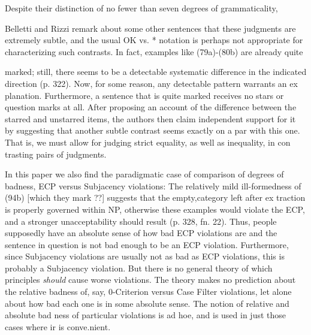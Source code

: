 \begin{styleTextbody}
Despite their distinction of no fewer than seven degrees of grammaticality,
\end{styleTextbody}


\begin{styleTextbody}
Belletti and Rizzi remark about some other sentences that {\textquotedbl}these judgments are extremely subtle, and the usual OK vs. * notation is perhaps not appropriate for characterizing such contrasts. In fact, examples like (79a)-(80b) are already quite
\end{styleTextbody}


\begin{styleTextbody}
marked; still, there seems to be a detectable systematic difference in the indicated direction{\textquotedbl} (p. 322). Now, for some reason, any detectable pattern warrants an ex\- planation. Furthermore, a sentence that is {\textquotedbl}quite marked{\textquotedbl} receives no stars or question marks at all. After proposing an account of the difference between the starred and unstarred items, the authors then claim independent support for it by suggesting that another subtle contrast seems {\textquotedbl}exactly on a par with{\textquotedbl} this one. That is, we must allow for judging strict equality, as well as inequality, in con\- trasting pairs of judgments.
\end{styleTextbody}


\begin{styleTextbody}
In this paper we also find the paradigmatic case of comparison of degrees of badness, ECP versus Subjacency violations: {\textquotedbl}The relatively mild ill-formedness of (94b) [which they mark {\textquotedbl}??{\textquotedbl}] suggests that the empty,category left after ex\- traction is properly governed within NP, otherwise these examples would violate the ECP, and a stronger unacceptability should result{\textquotedbl} (p. 328, fn. 22). Thus, people supposedly have an absolute sense of how bad ECP violations are and the sentence in question is not bad enough to be an ECP violation. Furthermore, since Subjacency violations are usually not as bad as ECP violations, this is probably a Subjacency violation. But there is no general theory of which principles \textit{should}\textit{ }cause worse violations. The theory makes no prediction about the relative badness of, say, 0-Criterion versus Case Filter violations, let alone about how bad each one is in some absolute sense. The notion of relative and absolute bad\- ness of particular violations is ad hoe, and is used in just those cases where ir is conve.nient.
\end{styleTextbody}


